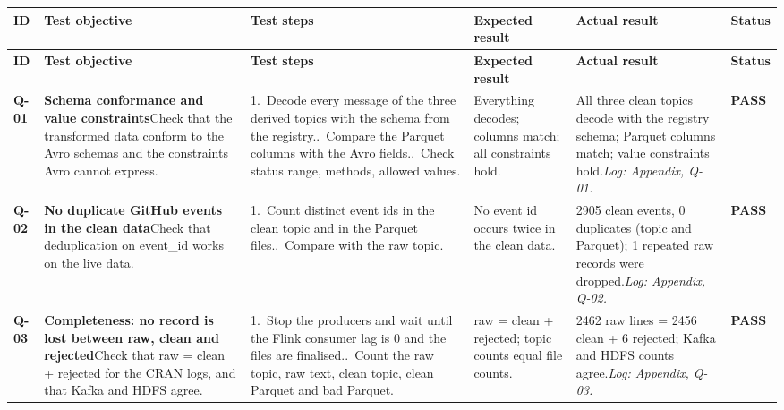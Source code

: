 {\footnotesize
\begin{longtable}{@{}L{1.1cm}L{5.8cm}L{5.4cm}L{3.9cm}L{5.5cm}L{1.3cm}@{}}
\toprule
\textbf{ID} & \textbf{Test objective} & \textbf{Test steps} & \textbf{Expected result} & \textbf{Actual result} & \textbf{Status} \\
\midrule
\endfirsthead
\toprule
\textbf{ID} & \textbf{Test objective} & \textbf{Test steps} & \textbf{Expected result} & \textbf{Actual result} & \textbf{Status} \\
\midrule
\endhead
\bottomrule
\endfoot
\textbf{Q-01} & \textbf{Schema conformance and value constraints}\newline Check that the transformed data conform to the Avro schemas and the constraints Avro cannot express. & 1.~Decode every message of the three derived topics with the schema from the registry..~Compare the Parquet columns with the Avro fields..~Check status range, methods, allowed values. & Everything decodes; columns match; all constraints hold. & All three clean topics decode with the registry schema; Parquet columns match; value constraints hold.\newline \textit{Log: Appendix, Q-01.} & \textbf{\textcolor{green!45!black}{PASS}} \\
\midrule[0.3pt]
\textbf{Q-02} & \textbf{No duplicate GitHub events in the clean data}\newline Check that deduplication on event\_\allowbreak{}id works on the live data. & 1.~Count distinct event ids in the clean topic and in the Parquet files..~Compare with the raw topic. & No event id occurs twice in the clean data. & 2905 clean events, 0 duplicates (topic and Parquet); 1 repeated raw records were dropped.\newline \textit{Log: Appendix, Q-02.} & \textbf{\textcolor{green!45!black}{PASS}} \\
\midrule[0.3pt]
\textbf{Q-03} & \textbf{Completeness: no record is lost between raw, clean and rejected}\newline Check that raw = clean + rejected for the CRAN logs, and that Kafka and HDFS agree. & 1.~Stop the producers and wait until the Flink consumer lag is 0 and the files are finalised..~Count the raw topic, raw text, clean topic, clean Parquet and bad Parquet. & raw = clean + rejected; topic counts equal file counts. & 2462 raw lines = 2456 clean + 6 rejected; Kafka and HDFS counts agree.\newline \textit{Log: Appendix, Q-03.} & \textbf{\textcolor{green!45!black}{PASS}} \\

\end{longtable}}
